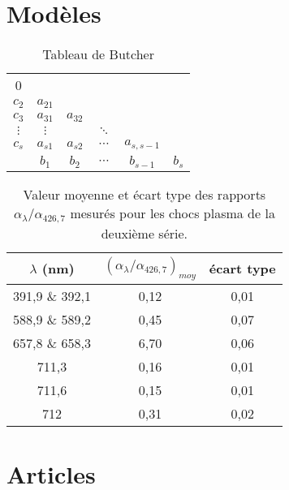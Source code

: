 \section{Modèles}
\lipsum[11]
\begin{table}[h!tbp]
\begin{center}
\begin{tabular}{c|*{5}{c}}
0\\
$c_2$    & $a_{21}$\\
$c_3$    & $a_{31}$ & $a_{32}$\\
$\vdots$ & $\vdots$ &           & $\ddots$\\
$c_s$    & $a_{s1}$ & $a_{s2}$  & $\cdots$ & $a_{s,s - 1}$\\
\hline
         & $b_1$    & $b_2$     & $\cdots$ & $b_{s-1}$     & $b_s$\\
\end{tabular}
\end{center}
\caption{Tableau de Butcher}
\label{table:butcher}
\end{table}
\lipsum[2]
\begin{table}[h!tbp]
\begin{center}
\begin{tabular}{|c | c | c |}
\hline
$\lambda$ (nm) & $(\alpha_{\lambda}/\alpha_{426,7})_{moy}$ & écart type \\
\hline
391,9 \& 392,1 & 0,12 & 0,01 \\
588,9 \& 589,2 & 0,45 & 0,07 \\
657,8 \& 658,3 & 6,70 & 0,06 \\
711,3 & 0,16 & 0,01 \\
711,6 & 0,15 & 0,01 \\
712 & 0,31 & 0,02 \\
\hline
\end{tabular}
\end{center}
\caption[Valeur moyenne et écart type des rapports $\alpha_{\lambda}/\alpha_{426,7}$]{Valeur moyenne et écart type des rapports $\alpha_{\lambda}/\alpha_{426,7}$ mesurés pour les chocs plasma de la deuxième série.}
\label{table:alpha}
\end{table}
\newpage
\section{Articles}


